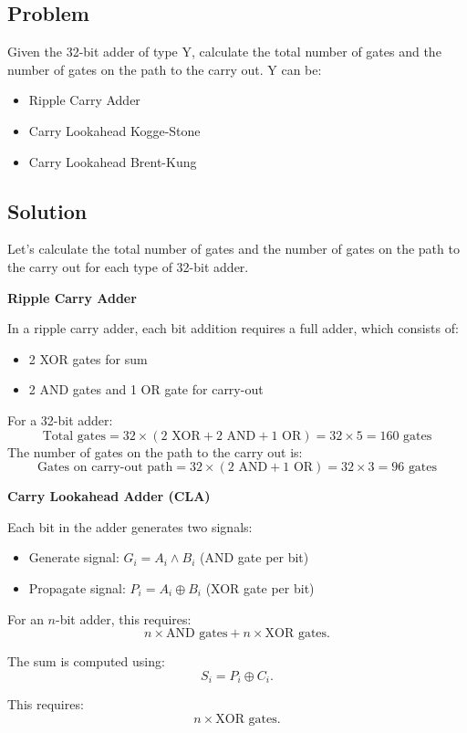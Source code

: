 \subsection*{Problem}
Given the 32-bit adder of type Y, calculate the total number of gates and
the number of gates on the path to the carry out. Y can be:
\begin{itemize}
    \item Ripple Carry Adder
    \item Carry Lookahead Kogge-Stone
    \item Carry Lookahead Brent-Kung
\end{itemize}

\subsection*{Solution}
Let's calculate the total number of gates and the number of gates on the path to the carry out for each type of 32-bit adder.

\textbf{Ripple Carry Adder}

In a ripple carry adder, each bit addition requires a full adder, which consists of:
\begin{itemize}
    \item 2 XOR gates for sum
    \item 2 AND gates and 1 OR gate for carry-out
\end{itemize}
For a 32-bit adder:
\[
\text{Total gates} = 32 \times (2 \text{ XOR} + 2 \text{ AND} + 1 \text{ OR}) = 32 \times 5 = 160 \text{ gates}
\]
The number of gates on the path to the carry out is:
\[
\text{Gates on carry-out path} = 32 \times (2 \text{ AND} + 1 \text{ OR}) = 32 \times 3 = 96 \text{ gates}
\]

\textbf{Carry Lookahead Adder (CLA)}

Each bit in the adder generates two signals:
\begin{itemize}
    \item Generate signal: \( G_i = A_i \land B_i \) (AND gate per bit)
    \item Propagate signal: \( P_i = A_i \oplus B_i \) (XOR gate per bit)
\end{itemize}

For an \( n \)-bit adder, this requires:
\[
n \times \text{AND gates} + n \times \text{XOR gates}.
\]

The sum is computed using:
\[
S_i = P_i \oplus C_i.
\]

This requires:
\[
n \times \text{XOR gates}.
\]


